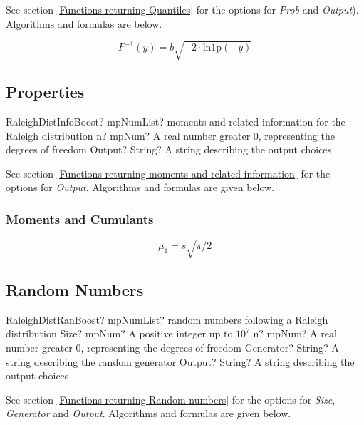 See section \ref{Functions returning Quantiles} for the options for  {\itshape\sffamily Prob} and {\itshape\sffamily Output}). Algorithms and formulas are below.

\begin{equation} 
	F^{-1}(y)= b \sqrt{-2 \cdot \text{ln1p}(-y)}
\end{equation}



\subsection{Properties}
\label{RaleighDistributionProperties}


\begin{mpFunctionsExtract}
	\mpFunctionTwo
	{RaleighDistInfoBoost? mpNumList? moments and related information for the Raleigh distribution}
	{n? mpNum? A real number greater 0, representing the degrees of freedom}
	{Output? String? A string describing the output choices}
\end{mpFunctionsExtract}

\vspace{0.3cm}

See section \ref{Functions returning moments and related information} for the options for {\itshape\sffamily Output}. Algorithms and formulas are given below.

\subsubsection{Moments and Cumulants}
\begin{equation} 
	\mu_1 = s \sqrt{\pi/2}
\end{equation}



\subsection{Random Numbers}

\begin{mpFunctionsExtract}
	\mpFunctionFour
	{RaleighDistRanBoost? mpNumList? random numbers following a Raleigh distribution}
	{Size? mpNum? A positive integer up to $10^7$}
	{n? mpNum? A real number greater 0, representing the degrees of freedom}
	{Generator? String? A string describing the random generator}
	{Output? String? A string describing the output choices}
\end{mpFunctionsExtract}


\vspace{0.3cm}
See section \ref{Functions returning Random numbers} for the options for  {\itshape\sffamily Size},  {\itshape\sffamily Generator} and {\itshape\sffamily Output}. Algorithms and formulas are given below.





